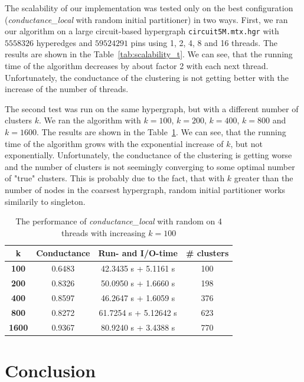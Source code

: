\documentclass[acmsmall,nonacm,screen,review]{acmart}
\begin{document}
The scalability of our implementation was tested only on the best configuration
(\textit{conductance\_local} with random initial partitioner) in two ways. First, 
we ran our algorithm on a large circuit-based hypergraph \texttt{circuit5M.mtx.hgr} 
with $5 558 326$ hyperedges and $59 524 291$ pins using 1, 2, 4, 8 and 16 threads.
The results are shown in the Table~\ref{tab:scalability_t}. We can see, that the 
running time of the algorithm decreases by about factor 2 with each next thread.
Unfortunately, the conductance of the clustering is not getting better with
the increase of the number of threads.

\smallskip
\noindent The second test was run on the same hypergraph, but with a different
number of clusters $k$. We ran the algorithm with $k = 100$, $k = 200$, $k = 400$, 
$k = 800$ and $k = 1600$. The results are shown in the Table~\ref{tab:scalability_k}. 
We can see, that the running time of the algorithm grows with the exponential increase 
of $k$, but not exponentially. Unfortunately, the conductance of the clustering is
getting worse and the number of clusters is not seemingly converging to some 
optimal number of "true" clusters. This is probably due to the fact, that with $k$
greater than the number of nodes in the coarsest hypergraph, random initial partitioner 
works similarily to singleton.

\begin{table}
    \centering
    \begin{tabular}{|c|c|c|c|} \hline
        \textbf{k} & \textbf{Conductance} & \textbf{Run- and I/O-time} & \textbf{\# clusters} \\ \hline
        \textbf{100} & 0.6483 & 42.3435 s + 5.1161 s & 100 \\ 
        \textbf{200} & 0.8326 & 50.0950 s + 1.6660 s & 198 \\ 
        \textbf{400} & 0.8597 & 46.2647 s + 1.6059 s & 376 \\ 
        \textbf{800} & 0.8272 & 61.7254 s + 5.12642 s & 623 \\ 
        \textbf{1600} & 0.9367 & 80.9240 s + 3.4388 s & 770 \\ \hline
    \end{tabular}
    \caption{The performance of \textit{conductance\_local} with random on 4 threads
    with increasing $k = 100$}
    \label{tab:scalability_k}
\end{table}

\section{Conclusion}
\label{sec:conclusion}
\end{document}
